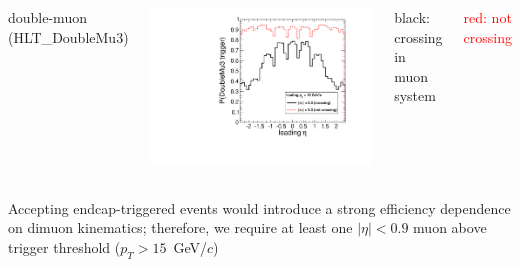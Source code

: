 \documentclass[compress]{beamer}
\begin{document}
\begin{frame}
\begin{columns}
\centering double-muon (HLT\_DoubleMu3)

\includegraphics[width=\linewidth]{eta_mass5cut_triggerDoubleMu3.pdf}

\scriptsize \centering black: crossing in muon system

\vspace{0.2 cm}
\textcolor{red}{red: not crossing}
\end{columns}

\vspace{0.5 cm}
Accepting endcap-triggered events would introduce a strong efficiency
dependence on dimuon kinematics; therefore, we require at least one
$|\eta| < 0.9$ muon above trigger threshold ($p_T > 15$~GeV/$c$)
\end{frame}
\end{document}
